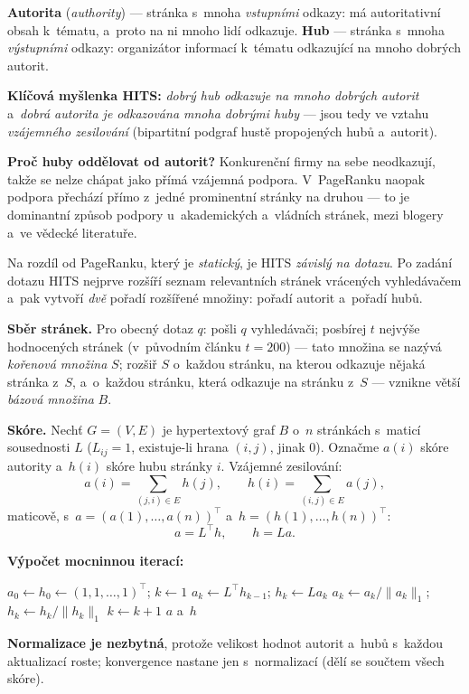 \documentclass[11pt,a4paper]{article}
\theoremstyle{definition}
\begin{document}
\begin{defbox}
\textbf{Autorita} (\emph{authority}) --- stránka s~mnoha \emph{vstupními} odkazy: má
autoritativní obsah k~tématu, a~proto na ni mnoho lidí odkazuje. \textbf{Hub} --- stránka
s~mnoha \emph{výstupními} odkazy: organizátor informací k~tématu odkazující na mnoho dobrých
autorit.

\textbf{Klíčová myšlenka HITS:} \emph{dobrý hub odkazuje na mnoho dobrých autorit} a~\emph{dobrá
autorita je odkazována mnoha dobrými huby} --- jsou tedy ve vztahu \emph{vzájemného zesilování}
(bipartitní podgraf hustě propojených hubů a~autorit).

\textbf{Proč huby oddělovat od autorit?} Konkurenční firmy na sebe neodkazují, takže se nelze
chápat jako přímá vzájemná podpora. V~PageRanku naopak podpora přechází přímo z~jedné prominentní
stránky na druhou --- to je dominantní způsob podpory u~akademických a~vládních stránek, mezi
blogery a~ve vědecké literatuře.
\end{defbox}

\begin{defbox}
Na rozdíl od PageRanku, který je \emph{statický}, je HITS \emph{závislý na dotazu}. Po zadání
dotazu HITS nejprve rozšíří seznam relevantních stránek vrácených vyhledávačem a~pak vytvoří
\emph{dvě} pořadí rozšířené množiny: pořadí autorit a~pořadí hubů.

\textbf{Sběr stránek.} Pro obecný dotaz $q$: pošli $q$ vyhledávači; posbírej $t$
nejvýše hodnocených stránek (v~původním článku $t=200$) --- tato množina se nazývá
\emph{kořenová množina} $S$; rozšiř $S$ o~každou stránku, na kterou odkazuje nějaká stránka
z~$S$, a~o~každou stránku, která odkazuje na stránku z~$S$ --- vznikne větší
\emph{bázová množina} $B$.

\textbf{Skóre.} Nechť $G=(V,E)$ je hypertextový graf $B$ o~$n$ stránkách s~maticí sousednosti
$L$ ($L_{ij}=1$, existuje-li hrana $(i,j)$, jinak 0). Označme $a(i)$ skóre autority a~$h(i)$
skóre hubu stránky $i$. Vzájemné zesilování:
\[ a(i)=\sum_{(j,i)\in E}h(j),\qquad h(i)=\sum_{(i,j)\in E}a(j), \]
maticově, s~$a=(a(1),\dots,a(n))^{\!\top}$ a~$h=(h(1),\dots,h(n))^{\!\top}$:
\[ a=L^{\!\top}h,\qquad h=La. \]

\textbf{Výpočet mocninnou iterací:}
\begin{algorithmic}[1]
\State $a_0\gets h_0\gets (1,1,\dots,1)^{\!\top}$; $k\gets 1$
\Repeat
  \State $a_k\gets L^{\!\top}h_{k-1}$; \quad $h_k\gets La_k$
  \State $a_k\gets a_k/\|a_k\|_1$; \quad $h_k\gets h_k/\|h_k\|_1$ 
  \State $k\gets k+1$
\State \Return $a$ a~$h$
\end{algorithmic}
\textbf{Normalizace je nezbytná}, protože velikost hodnot autorit a~hubů s~každou aktualizací
roste; konvergence nastane jen s~normalizací (dělí se součtem všech skóre).
\end{defbox}
\end{document}
